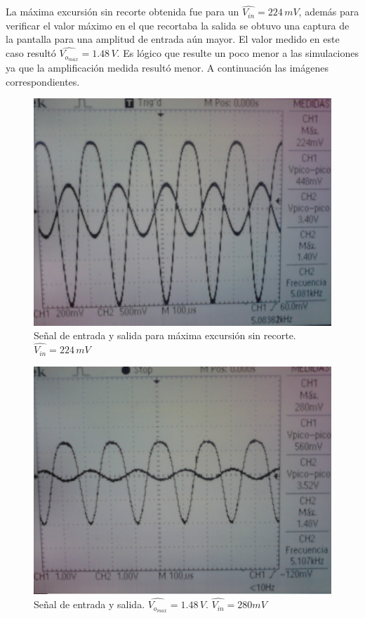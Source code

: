 \documentclass[10pt,spanish,a4paper,notitlepage]{article}
\begin{document}
La máxima excursión sin recorte obtenida fue para un $\widehat{V_{in}}=224\,\unit{mV}$, además para verificar el valor máximo en el que recortaba la salida se obtuvo una captura de la pantalla para una amplitud de entrada aún mayor. El valor medido en este caso resultó $\widehat{V_{o_{max}}}=1.48\,\unit{V}$. Es lógico que resulte un poco menor a las simulaciones ya que la amplificación medida resultó menor.
A continuación las imágenes correspondientes.

\begin{figure}[H]
\centering
\includegraphics[scale=0.15]{mediciones/Recorte_224mV.jpg}
\caption{Señal de entrada y salida para máxima excursión sin recorte. $\widehat{V_{in}}=224\,\unit{mV}$}
\label{fig:Recorte_224mV}
\end{figure}

\begin{figure}[H]
\centering
\includegraphics[scale=0.15]{mediciones/Recorte_280mV.jpg}
\caption{Señal de entrada y salida. $\widehat{V_{o_{max}}}=1.48\,\unit{V}$. $\widehat{V_{in}}=280mV$}
\label{fig:Recorte_280mV}
\end{figure}
\end{document}

